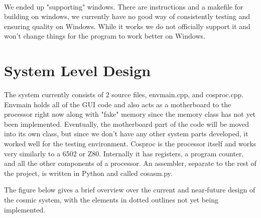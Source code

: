 \documentclass[conference]{IEEEtran}
\begin{document}
\\

We ended up "supporting" windows. There are instructions and a makefile for building on windows, we currently have no good way of consistently testing and ensuring quality on Windows. While it works we do not officially support it and won't change things for the program to work better on Windows. 


\section{System Level Design}

The system currently consists of 2 source files, envmain.cpp, and cosproc.cpp. Envmain holds all of the GUI code and also acts as a motherboard to the processor right now along with "fake" memory since the memory class has not yet been implemented. Eventually, the motherboard part of the code will be moved into its own class, but since we don't have any other system parts developed, it worked well for the testing environment. Cosproc is the processor itself and works very similarly to a 6502 or Z80. Internally it has registers, a program counter, and all the other components of a processor. An assembler, separate to the rest of the project, is written in Python and called cosasm.py. 

The figure below gives a brief overview over the current and near-future design of the cosmic system, with the elements in dotted outlines not yet being implemented.
\end{document}
